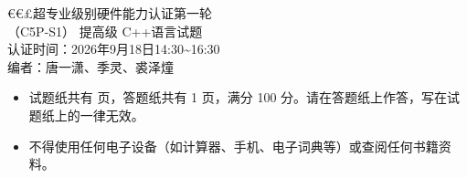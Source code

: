\documentclass[a4paper]{ctexart}
\newcommand{\wdot}{{\fontsize{12}{12}\selectfont\textbullet}}
\begin{document}
\begin{center}
{\dengxian
{\fontsize{15.95}{1} €€£超专业级别硬件能力认证第一轮} \\[1.5em]
    {\fontsize{15.95}{1}\selectfont （C5P-S1） 提高级 C++\hspace{0pt}语言试题} \\[1.5em]
{\fontsize{14.05}{1}\selectfont 认证时间：2026年9月18日14:30\textasciitilde16:30}\\[1em]
{\fontsize{12}{1}\selectfont 编者：唐一潇、季灵、裘泽燑}
}
\end{center}

\vspace{8pt}
\begin{itemize}[leftmargin=2.6em, itemsep=1pt, label={}]
  \item \wdot\hspace{0.5em}试题纸共有 \pageref{LastPage} 页，答题纸共有 1 页，满分 100 分。请在答题纸上作答，写在试题纸上的一律无效。
    \item \wdot\hspace{0.5em}不得使用任何电子设备（如计算器、手机、电子词典等）或查阅任何书籍资料。
\end{itemize}
\end{document}

